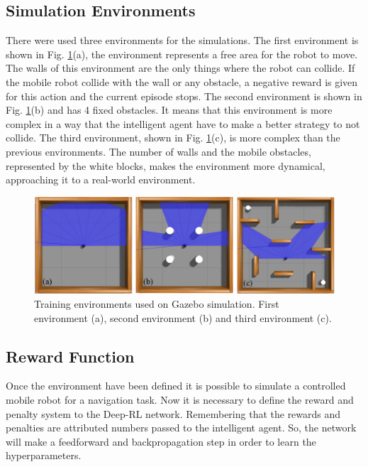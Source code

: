 \subsection*{Simulation Environments}

There were used three environments for the simulations. The first environment is  shown in Fig. \ref{fig:environments}(a), the environment represents a free area for the robot to move.
The walls of this environment are the only things where the robot can collide.
If the mobile robot collide with the wall or any obstacle, a negative reward is given for this action and the current episode stops.
The second environment is shown in Fig. \ref{fig:environments}(b) and has 4 fixed obstacles.
It means that this environment is more complex in a way that the intelligent agent have to make a better strategy to not collide.
The third environment, shown in Fig. \ref{fig:environments}(c), is more complex than the previous environments.  
The number of walls and the mobile obstacles, represented by the white blocks, makes the environment more dynamical, approaching it to a real-world environment.

\begin{figure}[H]
\centerline{\includegraphics[width=\columnwidth]{images/environments1.png}}
\caption{Training environments used on Gazebo simulation. First environment (a), second environment (b) and third environment (c).}
\label{fig:environments}
\end{figure}

\subsection*{Reward Function}

Once the environment have been defined it is possible to simulate a controlled mobile robot for a navigation task.
Now it is necessary to define the reward and penalty system to the Deep-RL network.
Remembering that the rewards and penalties are attributed numbers passed to the intelligent agent.
So, the network will make a feedforward and backpropagation step in order to learn the hyperparameters.

